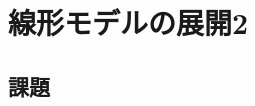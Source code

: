 \documentclass{ltjsbook}
\begin{document}
 
\chapter{線形モデルの展開2}
\label{chapter26} 


\section{課題}
\end{document}
